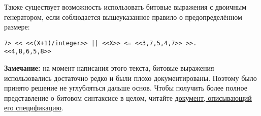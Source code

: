 Также существует возможность использовать битовые выражения с двоичным генератором, если соблюдается вышеуказанное правило о предопределённом размере:
\begin{lstlisting}[style=repl]
7> << <<(X+1)/integer>> || <<X>> <= <<3,7,5,4,7>> >>.
<<4,8,6,5,8>>
\end{lstlisting}
\colorbox{lgray}
{
    \begin{minipage}{\linewidth}
        \textbf{Замечание:} на момент написания этого текста, битовые выражения использовались достаточно редко и были плохо документированы. Поэтому было принято решение не углубляться дальше основ. Чтобы получить более полное представление о битовом синтаксисе в целом, читайте \href{http://user.it.uu.se/~pergu/papers/erlang05.pdf}{документ, описывающий его спецификацию}.
    \end{minipage}
}
